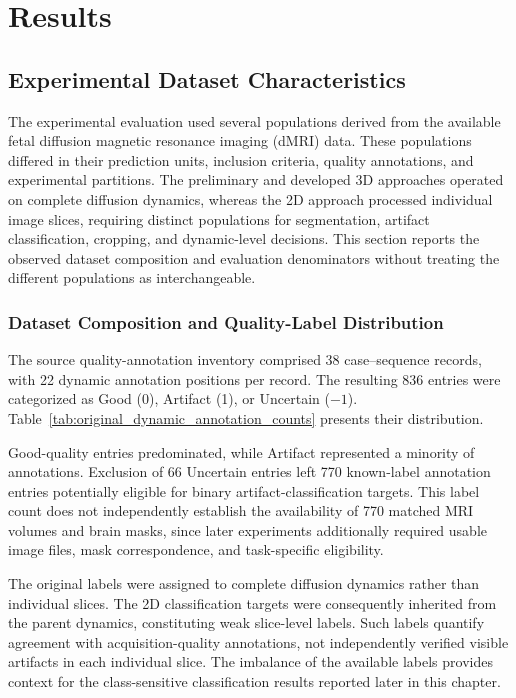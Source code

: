 \chapter{Results}

\section{Experimental Dataset Characteristics}
\label{sec:results_evaluation_framework}

The experimental evaluation used several populations derived from the available fetal diffusion magnetic resonance imaging (dMRI) data. These populations differed in their prediction units, inclusion criteria, quality annotations, and experimental partitions. The preliminary and developed 3D approaches operated on complete diffusion dynamics, whereas the 2D approach processed individual image slices, requiring distinct populations for segmentation, artifact classification, cropping, and dynamic-level decisions. This section reports the observed dataset composition and evaluation denominators without treating the different populations as interchangeable.

\subsection{Dataset Composition and Quality-Label Distribution}
\label{subsec:results_annotations}

The source quality-annotation inventory comprised 38 case--sequence records, with 22 dynamic annotation positions per record. The resulting 836 entries were categorized as Good (0), Artifact (1), or Uncertain ($-1$). Table~\ref{tab:original_dynamic_annotation_counts} presents their distribution.

Good-quality entries predominated, while Artifact represented a minority of annotations. Exclusion of 66 Uncertain entries left 770 known-label annotation entries potentially eligible for binary artifact-classification targets. This label count does not independently establish the availability of 770 matched MRI volumes and brain masks, since later experiments additionally required usable image files, mask correspondence, and task-specific eligibility.

The original labels were assigned to complete diffusion dynamics rather than individual slices. The 2D classification targets were consequently inherited from the parent dynamics, constituting weak slice-level labels. Such labels quantify agreement with acquisition-quality annotations, not independently verified visible artifacts in each individual slice. The imbalance of the available labels provides context for the class-sensitive classification results reported later in this chapter.

